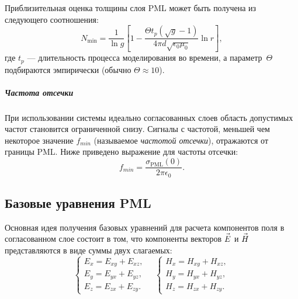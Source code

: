 \noindent
Приблизительная оценка толщины слоя PML может быть получена из следующего
соотношения:
\begin{equation}
\label{eq:hz1}
    N_\text{min}= \frac{1}{\ln g}
    \left[
        1 - \frac{\Theta t_p(\sqrt{g}-1)}{4\pi d \sqrt{\epsilon_0\mu_0}} \ln{r}
    \right],
\end{equation}
где $t_p$ --- длительность процесса моделирования во времени,
а параметр~$\Theta$ подбираются эмпирически (обычно $\Theta\approx10$).

\subparagraph{Частота отсечки}
При использовании системы идеально согласованных слоев область допустимых частот
становится ограниченной снизу. Сигналы с частотой, меньшей чем некоторое
значение $f_{min}$ (называемое \emph{частотой отсечки}), отражаются от границы
PML. Ниже приведено выражение для частоты отсечки:
\begin{equation}
    \label{eq:PmlCutoffFrequency}
    f_{min} = \frac{\sigma_\text{PML}(0)}{2\pi\epsilon_0}.
\end{equation}


\subsection{Базовые уравнения PML}

Основная идея получения базовых уравнений для расчета компонентов поля
в согласованном слое состоит в том, что компоненты векторов $\vec{E\mathstrut}$
и $\vec{H\mathstrut}$ представляются в виде суммы двух слагаемых:
\begin{equation}
\label{eq:PmlSplitFieldEquations}
\left\{
    \begin{aligned}
        E_x = E_{xy}+E_{xz}, \\
        E_y = E_{yx}+E_{yz}, \\
        E_z = E_{zx}+E_{zy}.
    \end{aligned}
\right.\quad
\left\{
    \begin{aligned}
        H_x = H_{xy}+H_{xz}, \\
        H_y = H_{yx}+H_{yz}, \\
        H_z = H_{zx}+H_{zy}.
    \end{aligned}
\right.
\end{equation}


